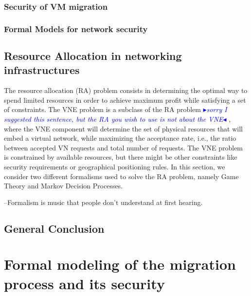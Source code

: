 \documentclass[a4paper, 11pt]{report}
\newcommand{\boxedtext}[1]{\fbox{\scriptsize\bfseries\textsf{#1}}}
\newcommand{\myremark}[2]{
   \textcolor{blue}{\boxedtext{#1}
      {\small$\blacktriangleright$\emph{\textsl{#2}}$\blacktriangleleft$}
}}
\newcommand\GB[1]{\myremark{GB}{#1}}
\newcommand{\ie}{i.e.,\xspace}
\theoremstyle{definition}
\begin{document}
\subsection{Security of VM migration}



\subsection{Formal Models for network security}



\section{Resource Allocation in networking infrastructures}
The resource allocation (RA) problem consists in determining the optimal way to spend limited resources in order to achieve maximum profit while satisfying a set of constraints.
The VNE problem is a subclass of the RA problem\GB{sorry I suggested this sentence, but the RA you wish to use is not about the VNE}, where the VNE component will determine the set of physical resources that will embed a virtual network, while maximizing the acceptance rate, \ie the ratio between accepted VN requests and total number of requests.
The VNE problem is constrained by available resources, but there might be other constraints like security requirements or geographical positioning rules.
In this section, we consider two different formalisms used to solve the RA problem, namely Game Theory and Markov Decision Processes. 

% 



\begin{savequote}

--Formalism is music that people don’t understand at first hearing.
\end{savequote}
\section{General Conclusion}


\newpage
\chapter{Formal modeling of the migration process and its security}
\label{sec:formal_model}

\end{document}

